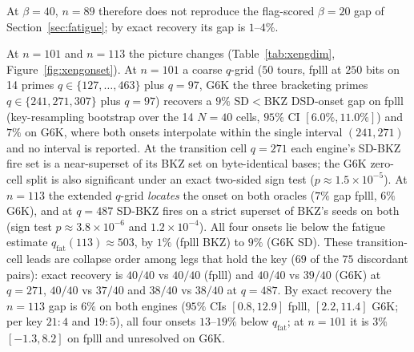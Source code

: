 \documentclass[journal=cic,version=preprint]{iacrj}
\begin{document}
At $\beta=40$, $n=89$ therefore does not reproduce the flag-scored $\beta=20$
gap of Section~\ref{sec:fatigue}; by exact recovery its gap is $1$--$4\%$.

At $n=101$ and $n=113$ the picture changes (Table~\ref{tab:xengdim},
Figure~\ref{fig:xengonset}). At $n=101$ a coarse $q$-grid ($50$ tours,
fplll at $250$ bits on 14 primes $q\in\{127,\dots,463\}$ plus $q=97$,
G6K the three bracketing primes $q\in\{241,271,307\}$ plus $q=97$) recovers a $9\%$ SD$<$BKZ DSD-onset
gap on fplll (key-resampling bootstrap over the 14 $N=40$ cells, $95\%$ CI
$[6.0\%,11.0\%]$) and $7\%$ on G6K, where both onsets interpolate within the
single interval $(241,271)$ and no interval is reported. At the transition
cell $q=271$ each engine's SD-BKZ fire set is a near-superset of its BKZ set
on byte-identical bases; the G6K zero-cell split is also significant under an
exact two-sided sign test ($p\approx1.5\times10^{-5}$). At $n=113$ the
extended $q$-grid \emph{locates} the onset on both oracles ($7\%$ gap fplll,
$6\%$ G6K), and at $q=487$ SD-BKZ fires on a strict superset of BKZ's seeds
on both (sign test $p\approx3.8\times10^{-6}$ and $1.2\times10^{-4}$). All
four onsets lie below the fatigue estimate $q_{\mathrm{fat}}(113)\approx503$,
by $1\%$ (fplll BKZ) to $9\%$ (G6K SD). These transition-cell leads are
collapse order among legs that hold the key ($69$ of the $75$ discordant
pairs): exact recovery is $40/40$ vs $40/40$ (fplll) and $40/40$ vs $39/40$
(G6K) at $q=271$, $40/40$ vs $37/40$ and $38/40$ vs $38/40$ at $q=487$. By
exact recovery the $n=113$ gap is $6\%$ on both engines ($95\%$ CIs
$[0.8,12.9]$ fplll, $[2.2,11.4]$ G6K; per key $21{:}4$ and $19{:}5$), all four
onsets $13$--$19\%$ below $q_\mathrm{fat}$; at $n=101$ it is $3\%$
$[-1.3,8.2]$ on fplll and unresolved on G6K.
\end{document}
